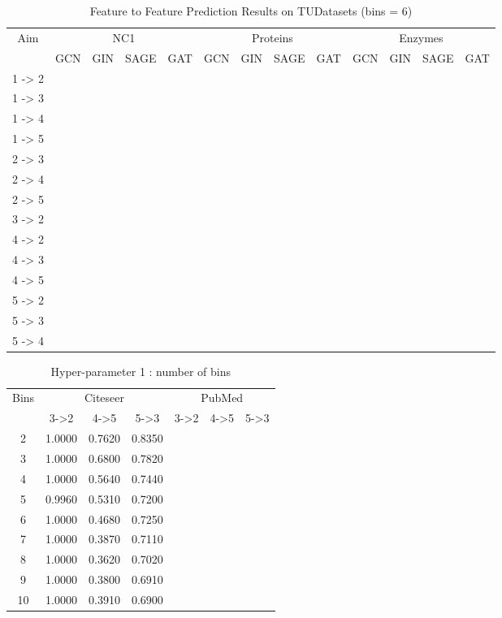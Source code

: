 \documentclass[sigconf]{acmart}
\begin{document}
\begin{table}[htb]
  \caption{Feature to Feature Prediction Results on TUDatasets (bins = 6)}
  \label{tab:commands}
  \begin{tabular}{*{13}{c}} \toprule
{Aim}  & \multicolumn{4}{c}{{\sc NC1}} & \multicolumn{4}{c}{{\sc Proteins}} & \multicolumn{4}{c}{{\sc Enzymes}}\\
\cmidrule(lr){2-5}\cmidrule(lr){6-9}\cmidrule(lr){10-13}
& GCN & GIN & SAGE & GAT & GCN & GIN & SAGE & GAT & GCN & GIN & SAGE & GAT \\ \hline
{1 -> 2} & & & &\\
{1 -> 3} \\
{1 -> 4} \\
{1 -> 5}\\
{2 -> 3}\\
{2 -> 4}\\
{2 -> 5}\\
{3 -> 2} \\	
{4 -> 2} \\
{4 -> 3} \\
{4 -> 5} \\
{5 -> 2} \\
{5 -> 3} \\
{5 -> 4} \\
\bottomrule
  \end{tabular}
\end{table}


\begin{table}[htb]
  \caption{Hyper-parameter 1 : number of bins}
  \label{tab:commands}
  \begin{tabular}{*{7}{c}} \toprule
{Bins}  & \multicolumn{3}{c}{{\sc Citeseer}} & \multicolumn{3}{c}{{\sc PubMed}} \\
\cmidrule(lr){2-4}\cmidrule(lr){5-7}
& 3->2 & 4->5 & 5->3 & 3->2 & 4->5 & 5->3 \\ \hline
2 & 1.0000& 0.7620& 0.8350 &   \\
3 & 1.0000& 0.6800& 0.7820 &   \\
4 & 1.0000& 0.5640 & 0.7440   \\
5 & 0.9960& 0.5310 & 0.7200   \\
6 & 1.0000& 0.4680 & 0.7250   \\
7 & 1.0000& 0.3870 & 0.7110   \\
8 & 1.0000& 0.3620 & 0.7020   \\
9 & 1.0000& 0.3800 & 0.6910   \\
10 & 1.0000& 0.3910 & 0.6900  \\
\bottomrule
  \end{tabular}
\end{table}
\end{document}
